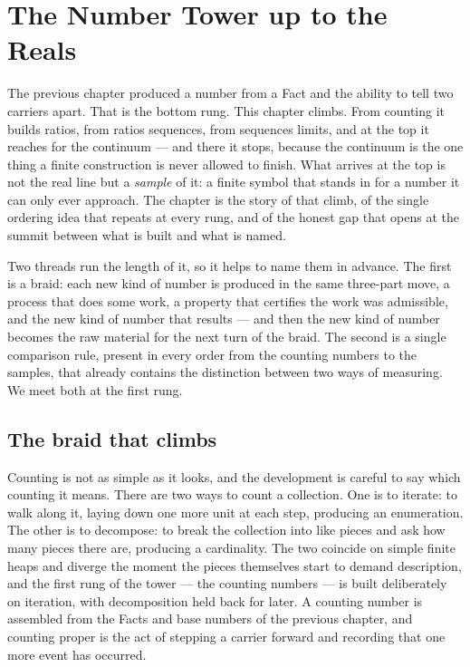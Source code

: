 \chapter{The Number Tower up to the Reals}
\label{chap:the-number-tower}

The previous chapter produced a number from a Fact and the ability to tell two carriers apart. That
is the bottom rung. This chapter climbs. From counting it builds ratios, from ratios sequences, from
sequences limits, and at the top it reaches for the continuum --- and there it stops, because the
continuum is the one thing a finite construction is never allowed to finish. What arrives at the top
is not the real line but a \emph{sample} of it: a finite symbol that stands in for a number it can
only ever approach. The chapter is the story of that climb, of the single ordering idea that repeats
at every rung, and of the honest gap that opens at the summit between what is built and what is named.

Two threads run the length of it, so it helps to name them in advance. The first is a braid: each new
kind of number is produced in the same three-part move, a process that does some work, a property that
certifies the work was admissible, and the new kind of number that results --- and then the new kind
of number becomes the raw material for the next turn of the braid. The second is a single comparison
rule, present in every order from the counting numbers to the samples, that already contains the
distinction between two ways of measuring. We meet both at the first rung.

\section{The braid that climbs}
\label{se:the-braid-that-climbs}

Counting is not as simple as it looks, and the development is careful to say which counting it means.
There are two ways to count a collection. One is to iterate: to walk along it, laying down one more
unit at each step, producing an enumeration. The other is to decompose: to break the collection into
like pieces and ask how many pieces there are, producing a cardinality. The two coincide on simple
finite heaps and diverge the moment the pieces themselves start to demand description, and the first
rung of the tower --- the counting numbers --- is built deliberately on iteration, with decomposition
held back for later. A counting number is assembled from the Facts and base numbers of the previous
chapter, and counting proper is the act of stepping a carrier forward and recording that one more
event has occurred.

